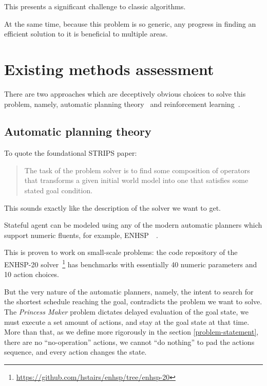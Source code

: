\documentclass[12pt, a4paper]{report}
\begin{document}
	This presents a significant challenge to classic algorithms.
	
	At the same time, because this problem is so generic, any progress in finding an efficient solution to it is beneficial to multiple areas.
	
	\section{Existing methods assessment}\label{introduction:assessment}

	There are two approaches which are deceptively obvious choices to solve this problem, namely, automatic planning theory~\cite{fikes1971strips} and reinforcement learning~\cite{sutton2018reinforcement}.
	
  \subsection{Automatic planning theory}
  
  To quote the foundational STRIPS paper:
  
  \blockcquote[p.~190]{fikes1971strips}
  {The task of the problem solver is to find some composition of operators that transforms a given initial world model into one that satisfies some stated goal condition.}
  
  This sounds exactly like the description of the solver we want to get.
  
  	Stateful agent can be modeled using any of the modern automatic planners which support numeric fluents, for example, ENHSP~\cite{enhsp::scala2020subgoaling}~\cite{enhsp::Scala2016IntervalBasedRF}.
	
	This is proven to work on small-scale problems: the code repository of the ENHSP-20 solver~\footnote{\url{https://github.com/hstairs/enhsp/tree/enhsp-20}} has benchmarks with essentially 40 numeric parameters and 10 action choices.
	
	But the very nature of the automatic planners, namely, the intent to search for the shortest schedule reaching the goal, contradicts the problem we want to solve.
	The \textit{Princess Maker} problem dictates delayed evaluation of the goal state, we must execute a set amount of actions, and stay at the goal state at that time.
	More than that, as we define more rigorously in the section \ref{problem-statement}, there are no ``no-operation'' actions, we cannot ``do nothing'' to pad the actions sequence, and every action changes the state.
	
\end{document}
